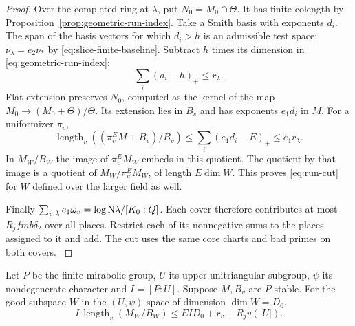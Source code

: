 \begin{proof}
Over the completed ring at \(\lambda\), put \(N_0=M_0\cap\Theta\).
It has finite colength by Proposition~\ref{prop:geometric-run-index}.
Take a Smith basis with exponents \(d_i\). The span of the basis
vectors for which \(d_i>h\) is an admissible test space:
\(\nu_\lambda=e_2\nu_*\) by \eqref{eq:slice-finite-baseline}.
Subtract \(h\) times its dimension in \eqref{eq:geometric-run-index}:
\[
 \sum_i(d_i-h)_+\le r_\lambda .
\]
Flat extension preserves \(N_0\), computed as the kernel of the map
\(M_0\to (M_0+\Theta)/\Theta\). Its extension lies in \(B_v\) and
has exponents \(e_1d_i\) in \(M\). For a uniformizer \(\pi_v\),
\[
 \operatorname{length}_v((\pi_v^EM+B_v)/B_v)
 \le\sum_i(e_1d_i-E)_+\le e_1r_\lambda .
\]
In \(M_W/B_W\) the image of \(\pi_v^EM_W\) embeds in this quotient.
The quotient by that image is a quotient of \(M_W/\pi_v^EM_W\),
of length \(E\dim W\). This proves \eqref{eq:run-cut} for \(W\)
defined over the larger field as well.

Finally \(\sum_{v\mid\lambda}e_1\omega_v=\log{\rm N}\lambda/[K_0:Q]\).
Each cover therefore contributes at most \(R_jfmb\delta_2\) over
all places. Restrict each of its nonnegative sums to the places
assigned to it and add. The cut uses the same core charts and bad
primes on both covers. \label{cor:paired-row-indices-3}
\end{proof}
\begin{lemma}
Let \(P\) be the finite mirabolic group, \(U\) its upper unitriangular
subgroup, \(\psi\) its nondegenerate character and \(I=[P:U]\).
Suppose \(M,B_v\) are \(P\)-stable. For the good subspace \(W\)
in the \((U,\psi)\)-space of dimension \(\dim W=D_0\),
\[
 I\,\operatorname{length}_v(M_W/B_W)
     \le E I D_0+r_v+R_j v(|U|).
\]
\end{lemma}
